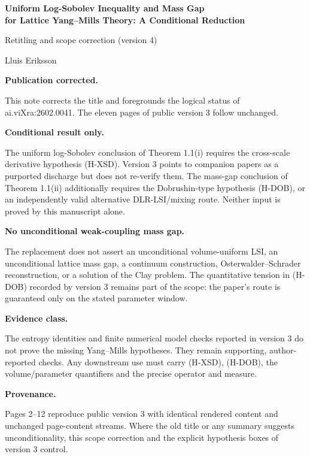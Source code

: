 \documentclass[11pt]{article}
\begin{document}
\begin{center}
{\Large\bfseries Uniform Log-Sobolev Inequality and Mass Gap\\
for Lattice Yang--Mills Theory: A Conditional Reduction\par}
\vspace{0.7em}
{\large Retitling and scope correction (version 4)\par}
\vspace{0.5em}
Lluis Eriksson
\end{center}

\textbf{Publication corrected.}\par
This note corrects the title and foregrounds the logical status of
ai.viXra:2602.0041.  The eleven pages of public version 3 follow unchanged.

\textbf{Conditional result only.}\par
The uniform log-Sobolev conclusion of Theorem 1.1(i) requires the cross-scale
derivative hypothesis (H-XSD).  Version 3 points to companion papers as a
purported discharge but does not re-verify them.  The mass-gap conclusion of
Theorem 1.1(ii) additionally requires the Dobrushin-type hypothesis (H-DOB), or
an independently valid alternative DLR-LSI/mixing route.  Neither input is
proved by this manuscript alone.

\textbf{No unconditional weak-coupling mass gap.}\par
The replacement does not assert an unconditional volume-uniform LSI, an
unconditional lattice mass gap, a continuum construction, Osterwalder--Schrader
reconstruction, or a solution of the Clay problem.  The quantitative tension
in (H-DOB) recorded by version 3 remains part of the scope: the paper's route is
guaranteed only on the stated parameter window.

\textbf{Evidence class.}\par
The entropy identities and finite numerical model checks reported in version 3
do not prove the missing Yang--Mills hypotheses.  They remain supporting,
author-reported checks.  Any downstream use must carry (H-XSD), (H-DOB), the
volume/parameter quantifiers and the precise operator and measure.

\textbf{Provenance.}\par
Pages 2--12 reproduce public version 3 with identical rendered content and
unchanged page-content streams.  Where the old
title or any summary suggests unconditionality, this scope correction and the
explicit hypothesis boxes of version 3 control.
\end{document}
